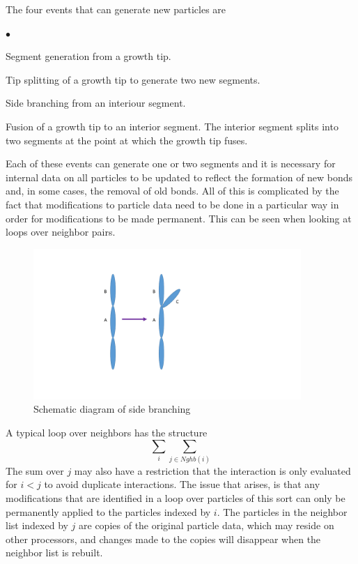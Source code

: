 \documentclass[12pt]{article}
\begin{document}
The four events that can generate new particles are
\begin{list}{$\bullet$}{}
\item Segment generation from a growth tip.
\item Tip splitting of a growth tip to generate two new segments.
\item Side branching from an interiour segment.
\item Fusion of a growth tip to an interior segment. The interior segment splits
into two segments at the point at which the growth tip fuses.
\end{list}
Each of these events can generate one or two segments and it is necessary for internal data
on all particles to be updated to reflect the formation of new bonds and, in some cases,
the removal of old bonds. All of this is complicated by the fact that modifications to
particle data need to be done in a particular way in order for modifications to be made
permanent. This can be seen when looking at loops over neighbor pairs.

\begin{figure}
\centering
\includegraphics[width=4.0in,keepaspectratio=true]{side_branch}
\caption{\label{fig:side_branch} Schematic diagram of side branching}
\end{figure}

A typical loop over neighbors has the structure
\[
\sum_{i}\sum_{j\in Nghb(i)}
\]
The sum over $j$ may also have a restriction that the interaction is only evaluated
for $i<j$ to avoid duplicate interactions. The issue that arises, is that any
modifications that are identified in a loop over particles of this sort can only
be permanently applied to the particles indexed by $i$. The particles in the neighbor list
indexed by $j$ are copies of the original particle data, which may reside on other
processors, and changes made to the copies will disappear when the neighbor list is rebuilt.
\end{document}
